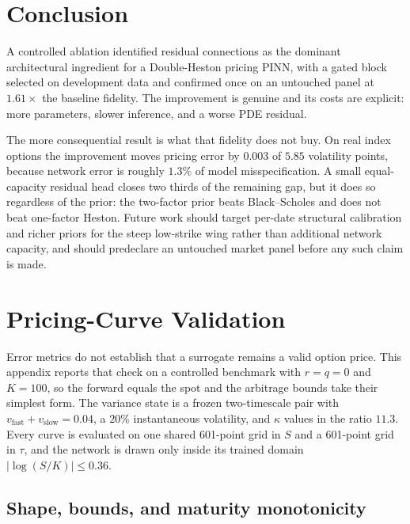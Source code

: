 \documentclass[conference]{IEEEtran}
\begin{document}
\section{Conclusion}

A controlled ablation identified residual connections as the dominant
architectural ingredient for a Double-Heston pricing PINN, with a gated block
selected on development data and confirmed once on an untouched panel at
$1.61\times$ the baseline fidelity. The improvement is genuine and its costs
are explicit: more parameters, slower inference, and a worse PDE residual.

The more consequential result is what that fidelity does not buy. On real
index options the improvement moves pricing error by $0.003$ of $5.85$
volatility points, because network error is roughly $1.3\%$ of model
misspecification. A small equal-capacity residual head closes two thirds of the
remaining gap, but it does so regardless of the prior: the two-factor prior
beats Black--Scholes and does not beat one-factor Heston. Future work should
target per-date structural calibration and richer priors for the steep
low-strike wing rather than additional network capacity, and should predeclare
an untouched market panel before any such claim is made.

\appendices

\section{Pricing-Curve Validation}
\label{app:curves}

Error metrics do not establish that a surrogate remains a valid option price.
This appendix reports that check on a controlled benchmark with $r=q=0$ and
$K=100$, so the forward equals the spot and the arbitrage bounds take their
simplest form. The variance state is a frozen two-timescale pair with
$v_{\text{fast}}+v_{\text{slow}}=0.04$, a $20\%$ instantaneous volatility, and
$\kappa$ values in the ratio $11.3$. Every curve is evaluated on one shared
601-point grid in $S$ and a 601-point grid in $\tau$, and the network is drawn
only inside its trained domain $|\log(S/K)|\le0.36$.

\subsection{Shape, bounds, and maturity monotonicity}
\end{document}
